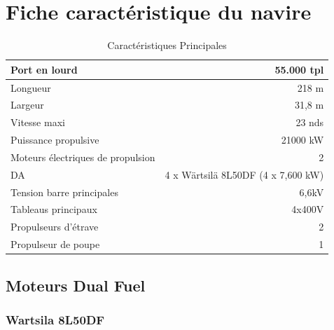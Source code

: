 \documentclass[12pt,a4paper]{article}
\begin{document}
\section{Fiche caractéristique du navire }
\begin{table}[htbp]
\begin{tabular}{|l|r|}
\hline
Port en lourd & 55.000 tpl \\ \hline
Longueur & 218 m \\ \hline
Largeur & 31,8 m \\ \hline
Vitesse maxi & 23 nds \\ \hline
Puissance propulsive & 21000 kW \\ \hline
Moteurs électriques de propulsion & 2 \\ \hline
DA & 4 x Wärtsilä 8L50DF (4 x 7,600 kW) \\ \hline
Tension barre principales & 6,6kV \\ \hline
Tableaus principaux & 4x400V \\ \hline
Propulseurs d'étrave & 2 \\ \hline
Propulseur de poupe & 1 \\ \hline
\end{tabular}
\caption{Caractéristiques Principales}
\label{}
\end{table}


\subsection{Moteurs Dual Fuel}

\subsubsection{Wartsila 8L50DF}
\end{document}
